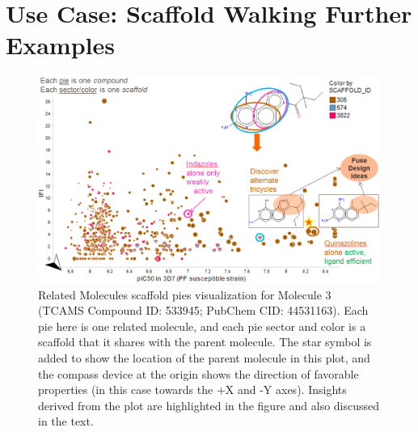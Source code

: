 \documentclass[11pt,letterpaper]{article}
\begin{document}
\newpage 
\section{Use Case: Scaffold Walking Further Examples}\label{sec:scafwalk_eg}

\begin{figure}
\includegraphics[width=6in]{../fig/mol2_RGtool_scafpie2.png}
\caption{Related Molecules scaffold pies visualization for Molecule 3 (TCAMS Compound ID: 533945; PubChem CID: 44531163). Each pie here is one related molecule, and each pie sector and color is a scaffold that it shares with the parent molecule. The star symbol is added to show the location of the parent molecule in this plot, and the compass device at the origin shows the direction of favorable properties (in this case towards the +X and -Y axes). Insights derived from the plot are highlighted in the figure and also discussed in the text.}
\label{fig:scafwalk2}
\end{figure}
\end{document}
